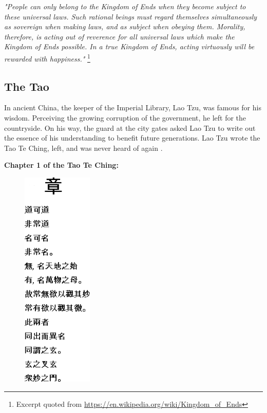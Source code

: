 \documentclass[11pt]{article}
\begin{document}
\bigskip
\textit{"People can only belong to the Kingdom of Ends when they become subject to these universal laws. 
Such rational beings must regard themselves simultaneously as sovereign when making laws, and as subject when obeying them. 
Morality, therefore, is acting out of reverence for all universal laws which make the Kingdom of Ends possible. 
In a true Kingdom of Ends, acting virtuously will be rewarded with happiness."} \footnote{Excerpt quoted from \url{https://en.wikipedia.org/wiki/Kingdom_of_Ends}}

\subsection{The Tao}

In ancient China, the keeper of the Imperial Library, Lao Tzu, was famous for his wisdom. Perceiving the growing corruption of the government, he left for the countryside. On his way, the guard at the city gates asked Lao Tzu to write out the essence of his understanding to benefit future generations. Lao Tzu wrote the Tao Te Ching, left, and was never heard of again \cite{tao_introduction}.

\medskip
\begin{center}
\textbf{\cite{tao_chapter1} Chapter 1 of the Tao Te Ching:}
\end{center}

\begin{figure}
    \centering
    \vspace{-49pt}
    \includegraphics[width=0.30\textwidth]{tao.png}
\end{figure}
\end{document}
